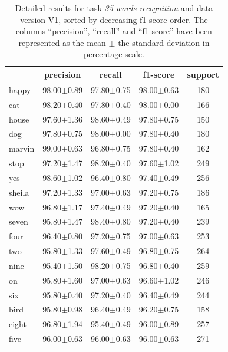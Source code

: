 \documentclass[review]{elsarticle}
\begin{document}
\begin{table}[h!] \centering \scriptsize
	\caption{Detailed results for task \textit{35-words-recognition} and data version V1, sorted by decreasing f1-score order. The columns ``precision'', ``recall'' and ``f1-score'' have been represented as the mean $\pm$ the standard deviation in percentage scale. }
	\begin{tabular}{lcccc}
		\toprule
		{} &       precision &          recall &        f1-score & support \\
		\midrule
		happy     &  98.00$\pm$0.89 &  97.80$\pm$0.75 &  98.00$\pm$0.63 &     180 \\
		cat       &  98.20$\pm$0.40 &  97.80$\pm$0.40 &  98.00$\pm$0.00 &     166 \\
		house     &  97.60$\pm$1.36 &  98.60$\pm$0.49 &  97.80$\pm$0.75 &     150 \\
		dog       &  97.80$\pm$0.75 &  98.00$\pm$0.00 &  97.80$\pm$0.40 &     180 \\
		marvin    &  99.00$\pm$0.63 &  96.80$\pm$0.75 &  97.80$\pm$0.40 &     162 \\
		stop      &  97.20$\pm$1.47 &  98.20$\pm$0.40 &  97.60$\pm$1.02 &     249 \\
		yes       &  98.60$\pm$1.02 &  96.40$\pm$0.80 &  97.40$\pm$0.49 &     256 \\
		sheila    &  97.20$\pm$1.33 &  97.00$\pm$0.63 &  97.20$\pm$0.75 &     186 \\
		wow       &  96.80$\pm$1.17 &  97.40$\pm$0.49 &  97.20$\pm$0.40 &     165 \\
		seven     &  95.80$\pm$1.47 &  98.40$\pm$0.80 &  97.20$\pm$0.40 &     239 \\
		four      &  96.40$\pm$0.80 &  97.20$\pm$0.75 &  97.00$\pm$0.63 &     253 \\
		two       &  95.80$\pm$1.33 &  97.60$\pm$0.49 &  96.80$\pm$0.75 &     264 \\
		nine      &  95.40$\pm$1.50 &  98.20$\pm$0.75 &  96.80$\pm$0.40 &     259 \\
		on        &  95.80$\pm$1.60 &  97.00$\pm$0.63 &  96.60$\pm$1.02 &     246 \\
		six       &  95.80$\pm$0.40 &  97.20$\pm$0.40 &  96.40$\pm$0.49 &     244 \\
		bird      &  95.80$\pm$0.98 &  96.40$\pm$0.49 &  96.20$\pm$0.75 &     158 \\
		eight     &  96.80$\pm$1.94 &  95.40$\pm$0.49 &  96.00$\pm$0.89 &     257 \\
		five      &  96.00$\pm$0.63 &  96.00$\pm$0.63 &  96.00$\pm$0.63 &     271 \\

\end{tabular}
\end{table}
\end{document}
